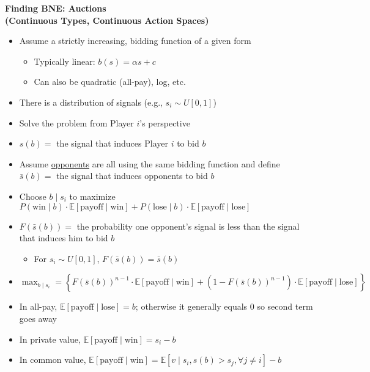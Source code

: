 \documentclass{report}
\newcommand{\FlowerSmall}{\mbox{\raisebox{-1pt}{\small\EightFlowerPetalRemoved}}} %
\begin{document}
\newpage
\begin{mdframed}
	\medskip
	\begin{center} \textbf{{\large Finding BNE: Auctions\\ {\normalsize (Continuous Types, Continuous Action Spaces)}}} \end{center}
	\begin{itemize}[label=\FlowerSmall]
		\item Assume a strictly increasing, bidding function of a given form
			\begin{itemize}
				\item Typically linear: $b(s) = \alpha s + c$
				\item Can also be quadratic (all-pay), log, etc.
			\end{itemize}
		\item There is a distribution of signals (e.g., $s_i \sim U[0,1]$)
		\item Solve the problem from Player $i$'s perspective
		\item $s(b) =$ the signal that induces Player $i$ to bid $b$
		\item Assume \underline{opponents} are all using the same bidding function and define $\bar{s}(b) = $ the signal that induces opponents to bid $b$
		\item Choose $b \mid s_i$ to maximize $P(\text{win} \mid b) \cdot \mathbb{E}[\text{payoff} \mid \text{win}] + P(\text{lose} \mid b) \cdot \mathbb{E}[\text{payoff} \mid \text{lose}]$ 
		\item $F(\bar{s}(b))=$ the probability one opponent's signal is less than the signal that induces him to bid $b$
			\begin{itemize}
				\item For $s_i \sim U[0,1]$, $F(\bar{s}(b)) = \bar{s}(b)$
			\end{itemize}
		\item $\displaystyle\max_{b \mid s_i} = \left\{  F(\bar{s}(b))^{n-1} \cdot \mathbb{E}[\text{payoff} \mid \text{win}] + (1 - F(\bar{s}(b))^{n-1}) \cdot \mathbb{E}[\text{payoff} \mid \text{lose}] \right\}$
		\item In all-pay, $\mathbb{E}[\text{payoff} \mid \text{lose}] = b$; otherwise it generally equals 0 so second term goes away
		\item In private value, $\mathbb{E}[\text{payoff} \mid \text{win}] = s_i - b$
		\item In common value, $\mathbb{E}[\text{payoff} \mid \text{win}] = \mathbb{E}[v \mid s_i, s(b) > s_j, \forall j \neq i] - b$

\end{itemize}
\end{mdframed}
\end{document}
